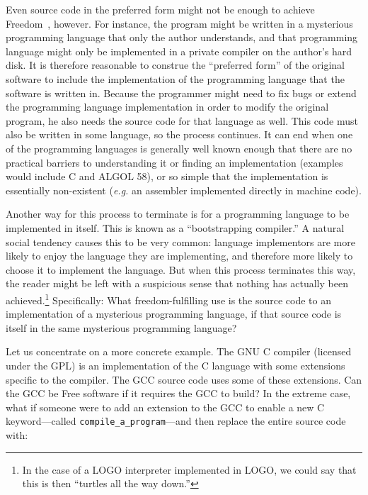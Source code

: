 \documentclass[twocolumn]{article}
\begin{document}
Even source code in the preferred form might not be enough to achieve
Freedom~\ftinker, however. For instance, the program might be written
in a mysterious programming language that only the author understands,
and that programming language might only be implemented in a private
compiler on the author's hard disk.\z{} It is therefore
reasonable to construe the ``preferred form'' of the original software
to include the implementation of the programming language that the
software is written in. Because the programmer might need to fix bugs
or extend the programming language implementation in order to modify
the original program, he also needs the source code for that language
as well. This code must also be written in some language, so the
process continues. It can end when one of the programming languages is
generally well known enough that there are no practical barriers to
understanding it or finding an implementation (examples would include
C and ALGOL 58), or so
simple that the implementation is essentially non-existent ({\em e.g.}
an assembler implemented directly in machine code).

Another way for this process to terminate is for a programming
language to be implemented in itself. This is known as a
``bootstrapping compiler.'' A natural social tendency causes this to
be very common: language implementors are more likely to enjoy the
language they are implementing, and therefore more likely to choose it
to implement the language. But when this process terminates this way,
the reader might be left with a suspicious sense that nothing has
actually been achieved.\z\footnote{In the case of a LOGO interpreter
implemented in LOGO, we could say that this is then ``turtles all the
way down.''} Specifically: What freedom-fulfilling use is the source
code to an implementation of a mysterious programming language, if
that source code is itself in the same mysterious programming
language?

Let us concentrate on a more concrete example. The GNU C
compiler (licensed under the GPL) is
an implementation of the C language with some extensions specific to
the compiler. The GCC source code uses some of these extensions. Can
the GCC be Free software if it requires the GCC to build? In the
extreme case, what if someone were to add an extension to the GCC to
enable a new C keyword---called {\tt compile\_a\_program}---and then
replace the entire source code with:
\end{document}
